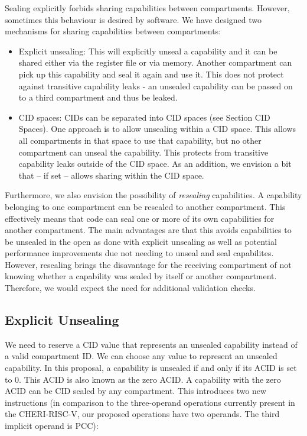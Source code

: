 Sealing explicitly forbids sharing capabilities between compartments.
However, sometimes this behaviour is desired by software. We have designed two mechanisms for sharing capabilities between compartments:

\begin{itemize}
\item Explicit unsealing: This will explicitly unseal a capability and it can be shared either via the register file or via memory.
Another compartment can pick up this capability and seal it again and use it.
This does not protect against transitive capability leaks - an unsealed capability can be passed on to a third compartment and thus be leaked.
\item CID spaces: CIDs can be separated into CID spaces (see Section CID Spaces).
One approach is to allow unsealing within a CID space.
This allows all compartments in that space to use that capability, but no other compartment can unseal the capability.
This protects from transitive capability leaks outside of the CID space.
As an addition, we envision a bit that -- if set -- allows sharing within the CID space.
\end{itemize}

Furthermore, we also envision the possibility of \textit{resealing} capabilities.
A capability belonging to one compartment can be resealed to another compartment.
This effectively means that code can seal one or more of its own capabilities for another compartment.
The main advantages are that this avoids capabilities to be unsealed in the open as done with explicit unsealing as well as potential performance improvements due not needing to unseal and seal capabilites.
However, resealing brings the disavantage for the receiving compartment of not knowing whether a capability was sealed by itself or another compartment.
Therefore, we would expect the need for additional validation checks.

\subsection{Explicit Unsealing}

We need to reserve a CID value that represents an unsealed capability instead of a valid compartment ID.
We can choose any value to represent an unsealed capability.
In this proposal, a capability is unsealed if and only if  its ACID is set to 0.
This ACID is also known as the zero ACID. A capability with the zero ACID can be CID sealed by any compartment.
This introduces two new instructions (in comparison to the three-operand operations currently present in the CHERI-RISC-V, our proposed operations have two operands. The third implicit operand is PCC):

